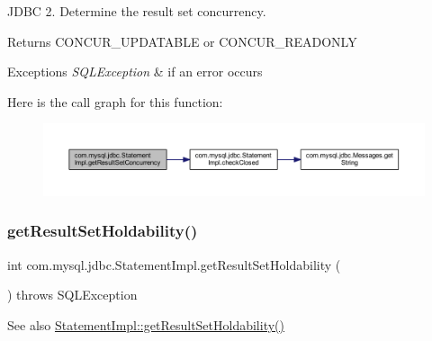 J\+D\+BC 2. Determine the result set concurrency.

\begin{DoxyReturn}{Returns}
C\+O\+N\+C\+U\+R\+\_\+\+U\+P\+D\+A\+T\+A\+B\+LE or C\+O\+N\+C\+U\+R\+\_\+\+R\+E\+A\+D\+O\+N\+LY
\end{DoxyReturn}

\begin{DoxyExceptions}{Exceptions}
{\em S\+Q\+L\+Exception} & if an error occurs \\
\hline
\end{DoxyExceptions}
Here is the call graph for this function\+:
\nopagebreak
\begin{figure}[H]
\begin{center}
\leavevmode
\includegraphics[width=350pt]{classcom_1_1mysql_1_1jdbc_1_1_statement_impl_ae2c130613ff533e0b972f7c6994363ba_cgraph}
\end{center}
\end{figure}
\mbox{\label{classcom_1_1mysql_1_1jdbc_1_1_statement_impl_abce10c0fd6e1477f4b13f4d62e621379}} 
\subsubsection{\texorpdfstring{get\+Result\+Set\+Holdability()}{getResultSetHoldability()}}
{\footnotesize\ttfamily int com.\+mysql.\+jdbc.\+Statement\+Impl.\+get\+Result\+Set\+Holdability (\begin{DoxyParamCaption}{ }\end{DoxyParamCaption}) throws S\+Q\+L\+Exception}

\begin{DoxySeeAlso}{See also}
\mbox{\hyperlink{classcom_1_1mysql_1_1jdbc_1_1_statement_impl_abce10c0fd6e1477f4b13f4d62e621379}{Statement\+Impl\+::get\+Result\+Set\+Holdability()}} 
\end{DoxySeeAlso}
\mbox{\label{classcom_1_1mysql_1_1jdbc_1_1_statement_impl_ad7e587ec083198d9d53f53a131917d22}} 
